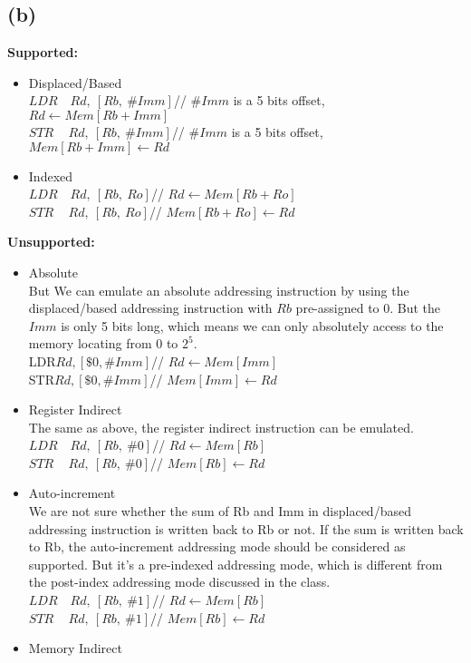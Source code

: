 \documentclass[a4paper, 11pt]{article}
\begin{document}
\subsection*{(b)}
\textbf{Supported:}
\begin{itemize}
\item Displaced/Based\\[5pt]
	$LDR\quad Rd,\ [Rb,\ \#Imm]$\qquad // $\#Imm$ is a 5 bits offset, $Rd \leftarrow Mem[Rb + Imm]$\\
    $STR\quad\, Rd,\ [Rb,\ \#Imm]$\qquad // $\#Imm$ is a 5 bits offset, $Mem[Rb + Imm] \leftarrow Rd$
\item Indexed\\[5pt]
	$LDR\quad Rd,\ [Rb,\ Ro]$\qquad \qquad // $Rd \leftarrow Mem[Rb + Ro]$\\
    $STR\quad\, Rd,\ [Rb,\ Ro]$\qquad \qquad // $Mem[Rb + Ro] \leftarrow Rd$\\
\end{itemize}


\textbf{Unsupported:}
\begin{itemize}
\item Absolute\\[5pt]
But We can emulate an absolute addressing instruction by using the displaced/based addressing instruction with $Rb$ pre-assigned to 0. But the $Imm$ is only 5 bits long, which means we can only absolutely access to the memory locating from 0 to $2^5$.\\[5pt]
	LDR\quad $Rd, [\$0, \#Imm]$\qquad \qquad // $Rd \leftarrow Mem[Imm]$\\
	STR\quad $Rd, [\$0, \#Imm]$\qquad \qquad // $Mem[Imm] \leftarrow Rd$
\item Register Indirect\\[5pt]
The same as above, the register indirect instruction can be emulated.\\[5pt]
	$LDR\quad Rd,\ [Rb,\ \#0]$\qquad \qquad // $Rd \leftarrow Mem[Rb]$\\
    $STR\quad\, Rd,\ [Rb,\ \#0]$\qquad \qquad // $Mem[Rb] \leftarrow Rd$\\
\item Auto-increment\\[5pt]
We are not sure whether the sum of Rb and Imm in displaced/based addressing instruction is written back to Rb or not. If the sum is written back to Rb, the auto-increment addressing mode should be considered as supported. But it's a pre-indexed addressing mode, which is different from the post-index addressing mode discussed in the class.\\[5pt]
	$LDR\quad Rd,\ [Rb,\ \#1]$\qquad \qquad // $Rd \leftarrow Mem[Rb]$\\
    $STR\quad\, Rd,\ [Rb,\ \#1]$\qquad \qquad // $Mem[Rb] \leftarrow Rd$\\
\item Memory Indirect\\[5pt]
\end{itemize}
\end{document}

